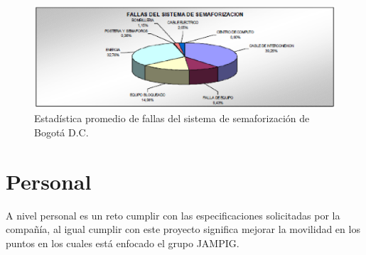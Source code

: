 \begin{figure}[h]
    \centering
    \includegraphics[width=1\textwidth]{ima/estadistica_php9hcqYv}
    \caption{Estadística promedio  de fallas del sistema de semaforización de Bogotá D.C. \cite{5}}
    \label{fig:mesh2}
\end{figure}

\section{Personal}
A nivel personal es un reto cumplir con las especificaciones solicitadas por la compañía, al igual cumplir con este 
proyecto significa mejorar la movilidad en los puntos en los cuales está enfocado el grupo JAMPIG.